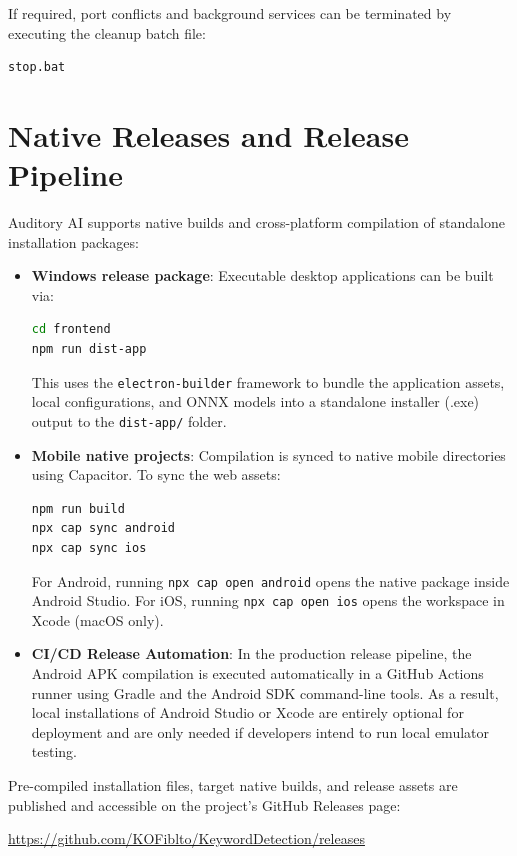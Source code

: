 \documentclass[11pt,a4paper]{article}
\begin{document}
If required, port conflicts and background services can be terminated by executing the cleanup batch file:
\begin{lstlisting}[language=bash]
stop.bat
\end{lstlisting}

\newpage
\section{Native Releases and Release Pipeline}
Auditory AI supports native builds and cross-platform compilation of standalone installation packages:
\begin{itemize}
    \item \textbf{Windows release package}: Executable desktop applications can be built via:
          \begin{lstlisting}[language=bash]
cd frontend
npm run dist-app
\end{lstlisting}
          This uses the \texttt{electron-builder} framework to bundle the application assets, local configurations, and ONNX models into a standalone installer (.exe) output to the \texttt{dist-app/} folder.
    \item \textbf{Mobile native projects}: Compilation is synced to native mobile directories using Capacitor.
          To sync the web assets:
          \begin{lstlisting}[language=bash]
npm run build
npx cap sync android
npx cap sync ios
\end{lstlisting}
          For Android, running \texttt{npx cap open android} opens the native package inside Android Studio. For iOS, running \texttt{npx cap open ios} opens the workspace in Xcode (macOS only).
    \item \textbf{CI/CD Release Automation}: In the production release pipeline, the Android APK compilation is executed automatically in a GitHub Actions runner using Gradle and the Android SDK command-line tools. As a result, local installations of Android Studio or Xcode are entirely optional for deployment and are only needed if developers intend to run local emulator testing.
\end{itemize}

Pre-compiled installation files, target native builds, and release assets are published and accessible on the project's GitHub Releases page:
\begin{center}
    \url{https://github.com/KOFiblto/KeywordDetection/releases}
\end{center}
\end{document}

